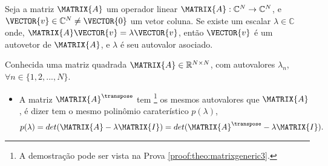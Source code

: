 \begin{definition}\label{def:matrixgeneric0}
Seja a matriz $\MATRIX{A}$ um operador linear $\MATRIX{A}: \mathbb{C}^{N} \rightarrow \mathbb{C}^{N}$,  
e $\VECTOR{v} \in \mathbb{C}^{N} \neq\VECTOR{0}$ um vetor coluna. Se existe um escalar $\lambda \in \mathbb{C}$ onde, 
$\MATRIX{A}\VECTOR{v}=\lambda\VECTOR{v}$,
então $\VECTOR{v}$ é um autovetor de $\MATRIX{A}$, e $\lambda$ é seu autovalor asociado.
\end{definition}


\begin{theorem}\label{theo:matrixgeneric3}
Conhecida uma matriz quadrada $\MATRIX{A} \in \mathbb{R}^{N \times N}$, 
com  autovalores $\lambda_n$, $\forall n \in \{1, 2, ..., N\}$.
\begin{itemize}
\item A matriz $\MATRIX{A}^{\transpose}$ tem
\footnote{A demostração pode ser vista na Prova \ref{proof:theo:matrixgeneric3}.} 
os mesmos autovalores que $\MATRIX{A}$, é dizer tem o mesmo polinômio caraterístico $p(\lambda)$,
\begin{equation}
p(\lambda)=det(\MATRIX{A}-\lambda \MATRIX{I})=det(\MATRIX{A}^{\transpose}-\lambda \MATRIX{I}).
\end{equation}
\end{itemize}
\end{theorem}
